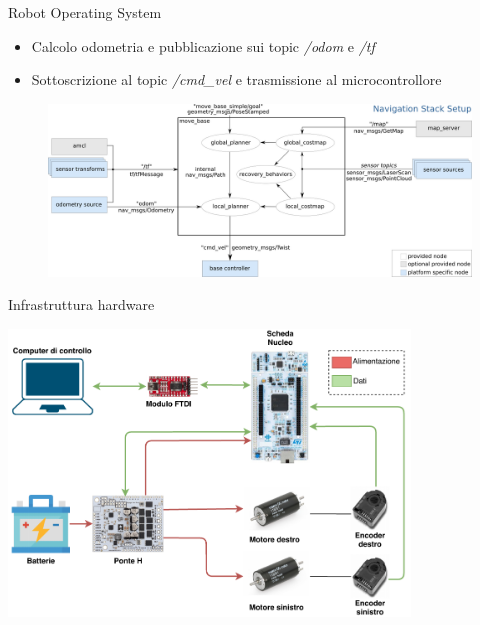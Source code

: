 \documentclass{beamer}
\begin{document}
\begin{tframe}{Robot Operating System}
\begin{itemize}
    \item Calcolo odometria e pubblicazione sui topic \textit{/odom} e \textit{/tf}
    \item Sottoscrizione al topic \textit{/cmd\_vel} e trasmissione al microcontrollore
\end{itemize}
\vspace{5mm}
\begin{figure}
         \centering
         \includegraphics[width=\columnwidth]{img/overview_tf.png}
    \end{figure}
\end{tframe}

\begin{tframe}{Infrastruttura hardware}
\begin{center}
    \includegraphics[width=0.8\textwidth]{img/infrastruttura1.pdf}
\end{center}
\end{tframe}
\end{document}

